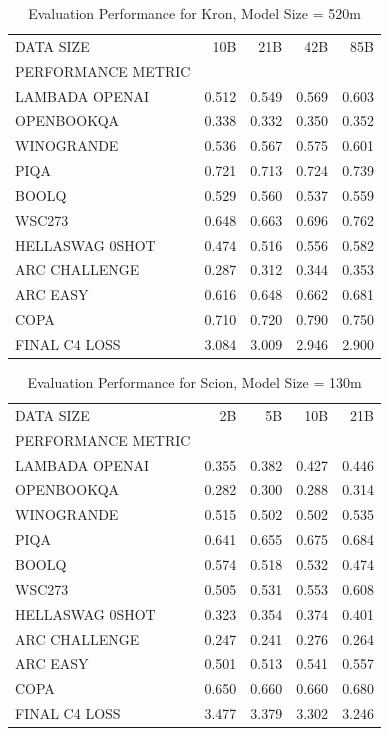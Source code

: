 \begin{table}
[H] \centering \caption{Evaluation Performance for Kron, Model Size = 520m}
\label{tab:eval-performance-kron-520M}
\begin{tabular}{lrrrr}
\toprule
DATA SIZE & 10B & 21B & 42B & 85B \\
PERFORMANCE METRIC &  &  &  &  \\
\midrule
LAMBADA OPENAI & 0.512 & 0.549 & 0.569 & 0.603 \\
OPENBOOKQA & 0.338 & 0.332 & 0.350 & 0.352 \\
WINOGRANDE & 0.536 & 0.567 & 0.575 & 0.601 \\
PIQA & 0.721 & 0.713 & 0.724 & 0.739 \\
BOOLQ & 0.529 & 0.560 & 0.537 & 0.559 \\
WSC273 & 0.648 & 0.663 & 0.696 & 0.762 \\
HELLASWAG 0SHOT & 0.474 & 0.516 & 0.556 & 0.582 \\
ARC CHALLENGE & 0.287 & 0.312 & 0.344 & 0.353 \\
ARC EASY & 0.616 & 0.648 & 0.662 & 0.681 \\
COPA & 0.710 & 0.720 & 0.790 & 0.750 \\
FINAL C4 LOSS & 3.084 & 3.009 & 2.946 & 2.900 \\
\bottomrule
\end{tabular}
\end{table}


\begin{table}
[H] \centering \caption{Evaluation Performance for Scion, Model Size = 130m}
\label{tab:eval-performance-scion-130M}
\begin{tabular}{lrrrr}
\toprule
DATA SIZE & 2B & 5B & 10B & 21B \\
PERFORMANCE METRIC &  &  &  &  \\
\midrule
LAMBADA OPENAI & 0.355 & 0.382 & 0.427 & 0.446 \\
OPENBOOKQA & 0.282 & 0.300 & 0.288 & 0.314 \\
WINOGRANDE & 0.515 & 0.502 & 0.502 & 0.535 \\
PIQA & 0.641 & 0.655 & 0.675 & 0.684 \\
BOOLQ & 0.574 & 0.518 & 0.532 & 0.474 \\
WSC273 & 0.505 & 0.531 & 0.553 & 0.608 \\
HELLASWAG 0SHOT & 0.323 & 0.354 & 0.374 & 0.401 \\
ARC CHALLENGE & 0.247 & 0.241 & 0.276 & 0.264 \\
ARC EASY & 0.501 & 0.513 & 0.541 & 0.557 \\
COPA & 0.650 & 0.660 & 0.660 & 0.680 \\
FINAL C4 LOSS & 3.477 & 3.379 & 3.302 & 3.246 \\
\bottomrule
\end{tabular}
\end{table}


